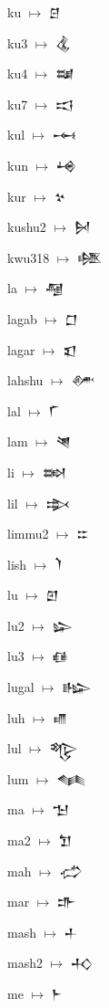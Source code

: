 {\noindent ku $\mapsto$ {\cufont 𒆪}\par
\noindent ku3 $\mapsto$ {\cufont 𒆬}\par
\noindent ku4 $\mapsto$ {\cufont 𒆭}\par
\noindent ku7 $\mapsto$ {\cufont 𒆯}\par
\noindent kul $\mapsto$ {\cufont 𒆰}\par
\noindent kun $\mapsto$ {\cufont 𒆲}\par
\noindent kur $\mapsto$ {\cufont 𒆳}\par
\noindent kushu2 $\mapsto$ {\cufont 𒆵}\par
\noindent kwu318 $\mapsto$ {\cufont 𒆶}\par
\noindent la $\mapsto$ {\cufont 𒆷}\par
\noindent lagab $\mapsto$ {\cufont 𒆸}\par
\noindent lagar $\mapsto$ {\cufont 𒇬}\par
\noindent lahshu $\mapsto$ {\cufont 𒇱}\par
\noindent lal $\mapsto$ {\cufont 𒇲}\par
\noindent lam $\mapsto$ {\cufont 𒇴}\par
\noindent li $\mapsto$ {\cufont 𒇷}\par
\noindent lil $\mapsto$ {\cufont 𒇸}\par
\noindent limmu2 $\mapsto$ {\cufont 𒇹}\par
\noindent lish $\mapsto$ {\cufont 𒇺}\par
\noindent lu $\mapsto$ {\cufont 𒇻}\par
\noindent lu2 $\mapsto$ {\cufont 𒇽}\par
\noindent lu3 $\mapsto$ {\cufont 𒈖}\par
\noindent lugal $\mapsto$ {\cufont 𒈗}\par
\noindent luh $\mapsto$ {\cufont 𒈛}\par
\noindent lul $\mapsto$ {\cufont 𒈜}\par
\noindent lum $\mapsto$ {\cufont 𒈝}\par
\noindent ma $\mapsto$ {\cufont 𒈠}\par
\noindent ma2 $\mapsto$ {\cufont 𒈣}\par
\noindent mah $\mapsto$ {\cufont 𒈤}\par
\noindent mar $\mapsto$ {\cufont 𒈥}\par
\noindent mash $\mapsto$ {\cufont 𒈦}\par
\noindent mash2 $\mapsto$ {\cufont 𒈧}\par
\noindent me $\mapsto$ {\cufont 𒈨}\par
}
